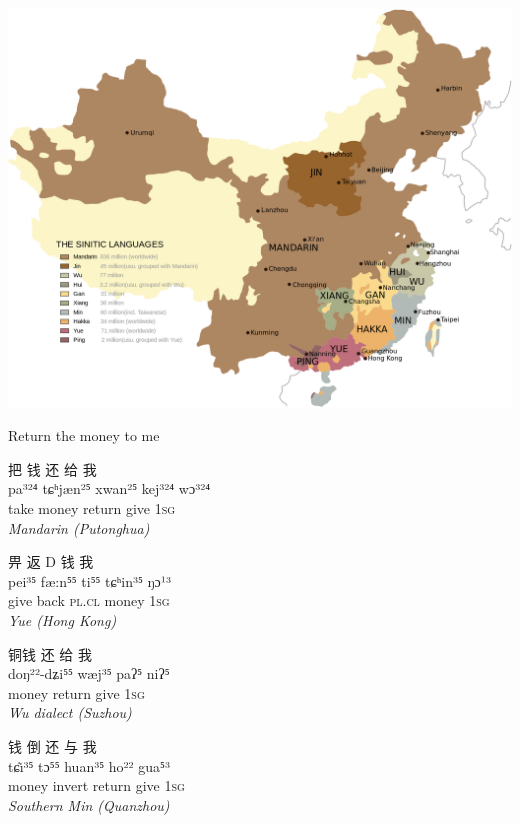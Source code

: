 \documentclass{beamer}
\begin{document}
\begin{frame}
  \begin{center} 
    \includegraphics[height=0.9\textheight]{pics/image15.png}
  \end{center}
\end{frame}



\begin{frame}

Return the money to me
\begin{exe}

\ex
\glll 把 钱 还 给 我 \\
     pa³²⁴ tɕʰjæn²⁵ xwan²⁵ kej³²⁴ wɔ³²⁴ \\
     take money return give 1\textsc{sg} \\ 
  \hfill     \textit{Mandarin (Putonghua)}
     
\ex \glll  畀 返 D 钱 我 \\
 pei³⁵ fæ:n⁵⁵ ti⁵⁵ tɕʰin³⁵ ŋɔ¹³ \\
 give back \textsc{pl.cl} money 1\textsc{sg} \\
\hfill  \textit{Yue (Hong Kong)}

\ex \glll 铜钱 还 给 我 \\
      doŋ²²-dʑi⁵⁵ wæj³⁵ paʔ⁵ niʔ⁵ \\
     money return give 1\textsc{sg} \\
 \hfill  \textit{Wu dialect (Suzhou)}


\ex \glll 钱 倒 还 与 我 \\
  tɕı̃³⁵ tɔ⁵⁵ huan³⁵ ho²² gua⁵³ \\
 money invert return give 1\textsc{sg} \\
 \hfill \textit{Southern Min (Quanzhou)}
  
\end{exe}
 
\end{frame}
\end{document}
